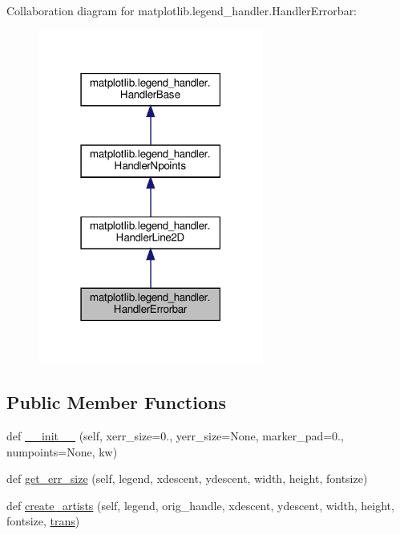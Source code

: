 Collaboration diagram for matplotlib.\+legend\+\_\+handler.\+Handler\+Errorbar\+:
\nopagebreak
\begin{figure}[H]
\begin{center}
\leavevmode
\includegraphics[width=210pt]{classmatplotlib_1_1legend__handler_1_1HandlerErrorbar__coll__graph}
\end{center}
\end{figure}
\subsection*{Public Member Functions}
\begin{DoxyCompactItemize}
\item 
def \hyperlink{classmatplotlib_1_1legend__handler_1_1HandlerErrorbar_a17bf2e4d0a16d84d5e0003358bde3b96}{\+\_\+\+\_\+init\+\_\+\+\_\+} (self, xerr\+\_\+size=0., yerr\+\_\+size=None, marker\+\_\+pad=0., numpoints=None, kw)
\item 
def \hyperlink{classmatplotlib_1_1legend__handler_1_1HandlerErrorbar_a5f6e303a1eef5cc3259aad6dc944cb65}{get\+\_\+err\+\_\+size} (self, legend, xdescent, ydescent, width, height, fontsize)
\item 
def \hyperlink{classmatplotlib_1_1legend__handler_1_1HandlerErrorbar_a0281092f4c192b8894c30159d660f718}{create\+\_\+artists} (self, legend, orig\+\_\+handle, xdescent, ydescent, width, height, fontsize, \hyperlink{size_2foo_8f90_afabfd8da71309850231a00e53c61f106}{trans})
\end{DoxyCompactItemize}


